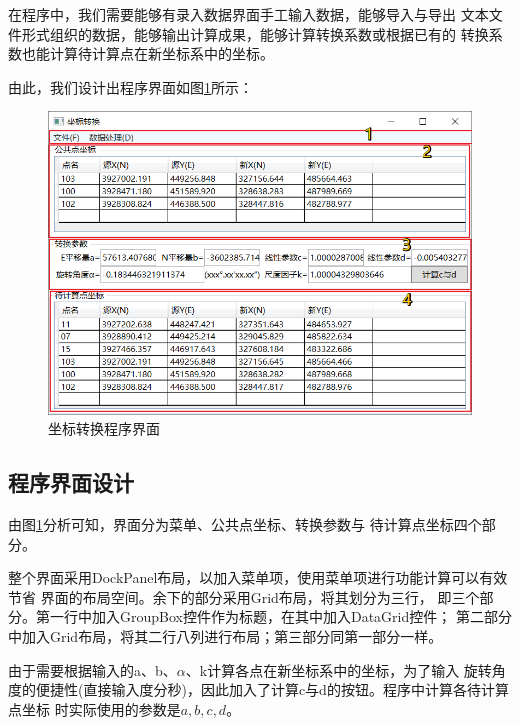 在程序中，我们需要能够有录入数据界面手工输入数据，能够导入与导出
文本文件形式组织的数据，能够输出计算成果，能够计算转换系数或根据已有的
转换系数也能计算待计算点在新坐标系中的坐标。

由此，我们设计出程序界面如图\ref{fig:XYtoXYUI02}所示：

\begin{figure}[htbp]
    \centering
    \includegraphics[scale=0.8]{xytoxy/XYtoXYUI02.png}
    \caption{坐标转换程序界面}
    \label{fig:XYtoXYUI02}
\end{figure}

\subsection{程序界面设计}

由图\ref{fig:XYtoXYUI02}分析可知，界面分为菜单、公共点坐标、转换参数与
待计算点坐标四个部分。

整个界面采用DockPanel布局，以加入菜单项，使用菜单项进行功能计算可以有效节省
界面的布局空间。余下的部分采用Grid布局，将其划分为三行，
即三个部分。第一行中加入GroupBox控件作为标题，在其中加入DataGrid控件；
第二部分中加入Grid布局，将其二行八列进行布局；第三部分同第一部分一样。

由于需要根据输入的a、b、$\alpha$、k计算各点在新坐标系中的坐标，为了输入
旋转角度的便捷性(直接输入度分秒)，因此加入了计算c与d的按钮。程序中计算各待计算点坐标
时实际使用的参数是$a,b,c,d$。

